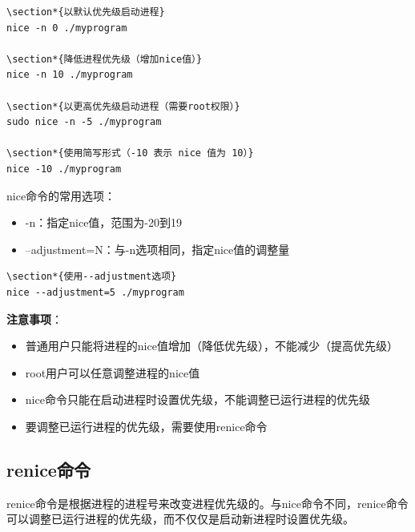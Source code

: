 \documentclass[12pt,UTF8]{ctexbook}
\begin{document}
\begin{verbatim}
\section*{以默认优先级启动进程}
nice -n 0 ./myprogram

\section*{降低进程优先级（增加nice值）}
nice -n 10 ./myprogram

\section*{以更高优先级启动进程（需要root权限）}
sudo nice -n -5 ./myprogram

\section*{使用简写形式（-10 表示 nice 值为 10）}
nice -10 ./myprogram
\end{verbatim}

nice命令的常用选项：
\begin{itemize}
    \item -n：指定nice值，范围为-20到19
    \item --adjustment=N：与-n选项相同，指定nice值的调整量
\end{itemize}

\begin{verbatim}
\section*{使用--adjustment选项}
nice --adjustment=5 ./myprogram
\end{verbatim}

\textbf{注意事项}：
\begin{itemize}
    \item 普通用户只能将进程的nice值增加（降低优先级），不能减少（提高优先级）
    \item root用户可以任意调整进程的nice值
    \item nice命令只能在启动进程时设置优先级，不能调整已运行进程的优先级
    \item 要调整已运行进程的优先级，需要使用renice命令
\end{itemize}

\subsection{renice命令}
renice命令是根据进程的进程号来改变进程优先级的。与nice命令不同，renice命令可以调整已运行进程的优先级，而不仅仅是启动新进程时设置优先级。
\end{document}
